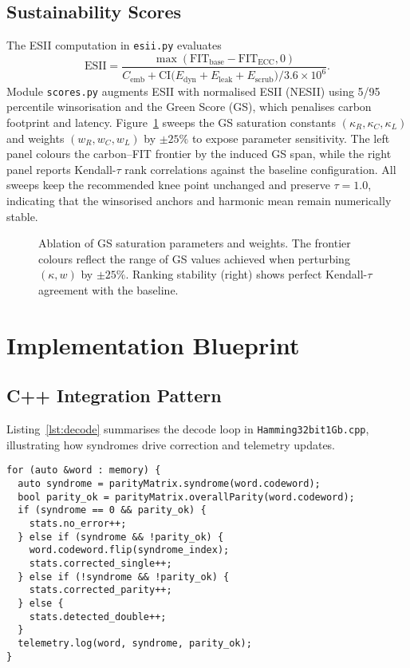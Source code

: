 \documentclass[conference]{IEEEtran}
\begin{document}
\subsection{Sustainability Scores}
The ESII computation in \texttt{esii.py} evaluates
\begin{equation}
    \text{ESII} = \frac{\max(\text{FIT}_{\text{base}}-\text{FIT}_{\text{ECC}},0)}{C_{\text{emb}} + \text{CI}\bigl(E_{\text{dyn}}+E_{\text{leak}}+E_{\text{scrub}}\bigr) / 3.6\times10^{6}}.
\end{equation}
Module \texttt{scores.py} augments ESII with normalised ESII (NESII) using 5/95 percentile winsorisation and the Green Score (GS), which penalises carbon footprint and latency.  Figure~\ref{fig:gs_ablation} sweeps the GS saturation constants $(\kappa_{R},\kappa_{C},\kappa_{L})$ and weights $(w_{R},w_{C},w_{L})$ by $\pm25\%$ to expose parameter sensitivity.  The left panel colours the carbon--FIT frontier by the induced GS span, while the right panel reports Kendall-$\tau$ rank correlations against the baseline configuration.  All sweeps keep the recommended knee point unchanged and preserve $\tau=1.0$, indicating that the winsorised anchors and harmonic mean remain numerically stable.

\begin{figure}[t]
    \centering
    \caption{Ablation of GS saturation parameters and weights.  The frontier colours reflect the range of GS values achieved when perturbing $(\kappa, w)$ by $\pm25\%$.  Ranking stability (right) shows perfect Kendall-$\tau$ agreement with the baseline.}
    \label{fig:gs_ablation}
\end{figure}
\section{Implementation Blueprint}
\subsection{C++ Integration Pattern}
Listing~\ref{lst:decode} summarises the decode loop in \texttt{Hamming32bit1Gb.cpp}, illustrating how syndromes drive correction and telemetry updates.
\begin{lstlisting}[style=ecccode,caption={SEC-DED decode pathway excerpt},label={lst:decode}]
for (auto &word : memory) {
  auto syndrome = parityMatrix.syndrome(word.codeword);
  bool parity_ok = parityMatrix.overallParity(word.codeword);
  if (syndrome == 0 && parity_ok) {
    stats.no_error++;
  } else if (syndrome && !parity_ok) {
    word.codeword.flip(syndrome_index);
    stats.corrected_single++;
  } else if (!syndrome && !parity_ok) {
    stats.corrected_parity++;
  } else {
    stats.detected_double++;
  }
  telemetry.log(word, syndrome, parity_ok);
}
\end{lstlisting}
\end{document}
